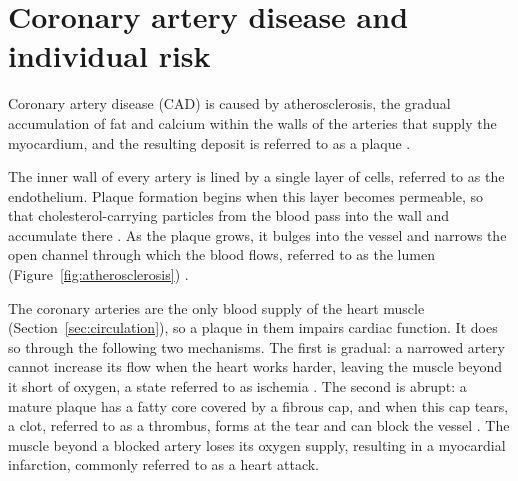 
\section{Coronary artery disease and individual risk}
\label{sec:disease}


Coronary artery disease (CAD) is caused by atherosclerosis, the gradual accumulation of fat and calcium within the walls of the arteries that supply the myocardium, and the resulting deposit is referred to as a plaque \cite{libby2019atherosclerosis}.

The inner wall of every artery is lined by a single layer of cells, referred to as the endothelium.
Plaque formation begins when this layer becomes permeable, so that cholesterol-carrying particles from the blood pass into the wall and accumulate there \cite{libby2019atherosclerosis}.
As the plaque grows, it bulges into the vessel and narrows the open channel through which the blood flows, referred to as the lumen (Figure~\ref{fig:atherosclerosis}) \cite{libby2019atherosclerosis}.

The coronary arteries are the only blood supply of the heart muscle (Section~\ref{sec:circulation}), so a plaque in them impairs cardiac function.
It does so through the following two mechanisms.
The first is gradual: a narrowed artery cannot increase its flow when the heart works harder, leaving the muscle beyond it short of oxygen, a state referred to as ischemia \cite{duncker2015regulation}.
The second is abrupt: a mature plaque has a fatty core covered by a fibrous cap, and when this cap tears, a clot, referred to as a thrombus, forms at the tear and can block the vessel \cite{libby2019atherosclerosis,rampidis2022geometry}.
The muscle beyond a blocked artery loses its oxygen supply, resulting in a myocardial infarction, commonly referred to as a heart attack.


